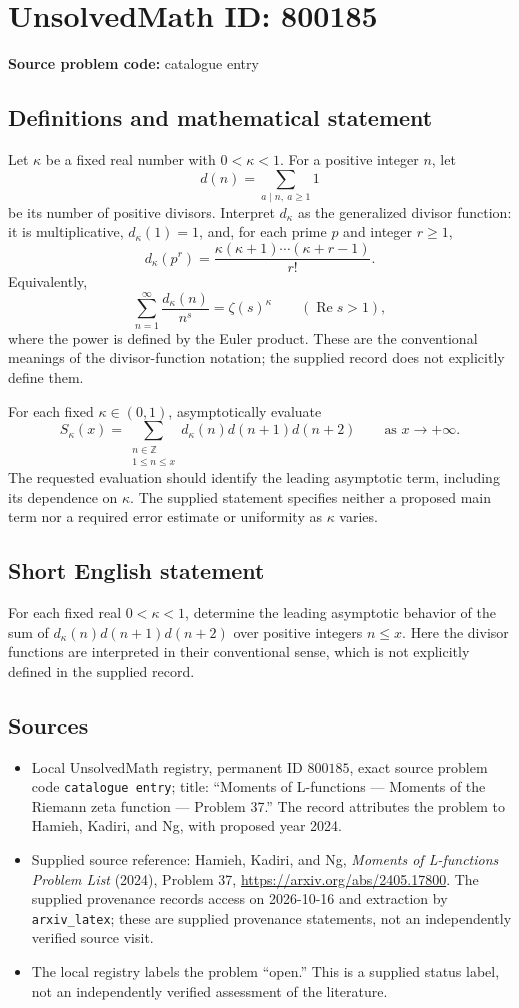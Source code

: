 \documentclass[11pt]{article}
\newcommand{\Z}{\mathbb{Z}}
\begin{document}
\section*{UnsolvedMath ID: 800185}
\textbf{Source problem code:} catalogue entry
\subsection{Definitions and mathematical statement}
Let \(\kappa\) be a fixed real number with \(0<\kappa<1\). For a positive integer \(n\), let
\[
d(n)=\sum_{a\mid n,\ a\geq 1}1
\]
be its number of positive divisors. Interpret \(d_{\kappa}\) as the generalized divisor function: it is multiplicative, \(d_{\kappa}(1)=1\), and, for each prime \(p\) and integer \(r\geq1\),
\[
d_{\kappa}(p^r)=\frac{\kappa(\kappa+1)\cdots(\kappa+r-1)}{r!}.
\]
Equivalently,
\[
\sum_{n=1}^{\infty}\frac{d_{\kappa}(n)}{n^s}=\zeta(s)^{\kappa}\qquad(\operatorname{Re}s>1),
\]
where the power is defined by the Euler product. These are the conventional meanings of the divisor-function notation; the supplied record does not explicitly define them.

For each fixed \(\kappa\in(0,1)\), asymptotically evaluate
\[
S_{\kappa}(x)=\sum_{\substack{n\in\Z\\1\leq n\leq x}}d_{\kappa}(n)d(n+1)d(n+2)
\qquad\text{as }x\to+\infty.
\]
The requested evaluation should identify the leading asymptotic term, including its dependence on \(\kappa\). The supplied statement specifies neither a proposed main term nor a required error estimate or uniformity as \(\kappa\) varies.
\subsection{Short English statement}
For each fixed real \(0<\kappa<1\), determine the leading asymptotic behavior of the sum of \(d_{\kappa}(n)d(n+1)d(n+2)\) over positive integers \(n\leq x\). Here the divisor functions are interpreted in their conventional sense, which is not explicitly defined in the supplied record.
\subsection{Sources}
\begin{itemize}
\item Local UnsolvedMath registry, permanent ID \(800185\), exact source problem code \texttt{catalogue entry}; title: ``Moments of L-functions --- Moments of the Riemann zeta function --- Problem 37.'' The record attributes the problem to Hamieh, Kadiri, and Ng, with proposed year 2024.
\item Supplied source reference: Hamieh, Kadiri, and Ng, \emph{Moments of L-functions Problem List} (2024), Problem 37, \url{https://arxiv.org/abs/2405.17800}. The supplied provenance records access on 2026-10-16 and extraction by \texttt{arxiv\_latex}; these are supplied provenance statements, not an independently verified source visit.
\item The local registry labels the problem ``open.'' This is a supplied status label, not an independently verified assessment of the literature.
\end{itemize}
\end{document}
